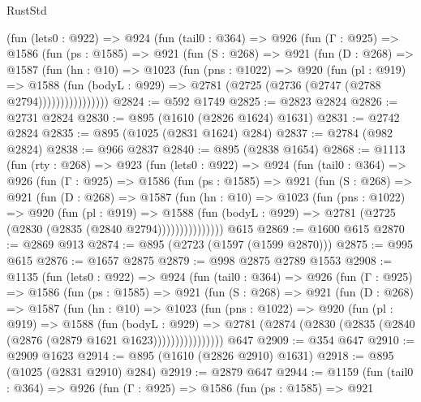 \begin{lexlean}{RustStd}
\begin{coremodule}
        (fun (lets0 : @922) =>
        @924
          (fun (tail0 : @364) =>
          @926
            (fun (Γ : @925) =>
            @1586
              (fun (ps : @1585) =>
              @921
                (fun (S : @268) =>
                @921
                  (fun (D : @268) =>
                  @1587
                    (fun (hn : @10) =>
                    @1023
                      (fun (pns : @1022) =>
                      @920
                        (fun (pl : @919) =>
                        @1588
                          (fun (bodyL : @929) =>
                          @2781 (@2725 (@2736 (@2747 (@2788 @2794))))))))))))))))
@2824 := @592 @1749
@2825 := @2823 @2824
@2826 := @2731 @2824
@2830 := @895 (@1610 (@2826 @1624) @1631)
@2831 := @2742 @2824
@2835 := @895 (@1025 (@2831 @1624) @284)
@2837 := @2784 (@982 @2824)
@2838 := @966 @2837
@2840 := @895 (@2838 @1654)
@2868 := @1113
    (fun (rty : @268) =>
    @923
      (fun (lets0 : @922) =>
      @924
        (fun (tail0 : @364) =>
        @926
          (fun (Γ : @925) =>
          @1586
            (fun (ps : @1585) =>
            @921
              (fun (S : @268) =>
              @921
                (fun (D : @268) =>
                @1587
                  (fun (hn : @10) =>
                  @1023
                    (fun (pns : @1022) =>
                    @920
                      (fun (pl : @919) =>
                      @1588
                        (fun (bodyL : @929) =>
                        @2781 (@2725 (@2830 (@2835 (@2840 @2794)))))))))))))))
    @615
@2869 := @1600 @615
@2870 := @2869 @913
@2874 := @895 (@2723 (@1597 (@1599 @2870)))
@2875 := @995 @615
@2876 := @1657 @2875
@2879 := @998 @2875 @2789 @1553
@2908 := @1135
    (fun (lets0 : @922) =>
    @924
      (fun (tail0 : @364) =>
      @926
        (fun (Γ : @925) =>
        @1586
          (fun (ps : @1585) =>
          @921
            (fun (S : @268) =>
            @921
              (fun (D : @268) =>
              @1587
                (fun (hn : @10) =>
                @1023
                  (fun (pns : @1022) =>
                  @920
                    (fun (pl : @919) =>
                    @1588
                      (fun (bodyL : @929) =>
                      @2781 (@2874 (@2830 (@2835 (@2840 (@2876 (@2879 @1621 @1623))))))))))))))))
    @647
@2909 := @354 @647
@2910 := @2909 @1623
@2914 := @895 (@1610 (@2826 @2910) @1631)
@2918 := @895 (@1025 (@2831 @2910) @284)
@2919 := @2879 @647
@2944 := @1159
    (fun (tail0 : @364) =>
    @926
      (fun (Γ : @925) =>
      @1586
        (fun (ps : @1585) =>
        @921

\end{coremodule}
\end{lexlean}
